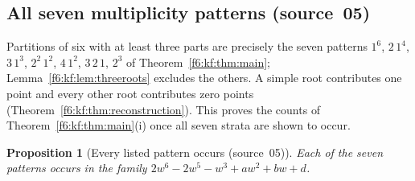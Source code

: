 \documentclass[11pt,a4paper]{article}
\newtheorem{proposition}[theorem]{Proposition}
\theoremstyle{definition}
\newcommand{\src}[1]{\textup{(source~#1)}}
\begin{document}
\subsection{All seven multiplicity patterns \src{05}}
\label{f6:kf:sec:patterns}
Partitions of six with at least three parts are precisely the seven patterns
$1^6$, $2\,1^4$, $3\,1^3$, $2^2\,1^2$, $4\,1^2$, $3\,2\,1$, $2^3$ of
Theorem~\ref{f6:kf:thm:main}; Lemma~\ref{f6:kf:lem:threeroots} excludes the
others. A simple root contributes one point and every other root contributes
zero points (Theorem~\ref{f6:kf:thm:reconstruction}). This proves the counts
of Theorem~\ref{f6:kf:thm:main}(i) once all seven strata are shown to occur.

\begin{proposition}[Every listed pattern occurs \src{05}]\label{f6:kf:prop:witnesses}
Each of the seven patterns occurs in the family
$2w^6-2w^5-w^3+aw^2+bw+d$.
\end{proposition}
\end{document}
